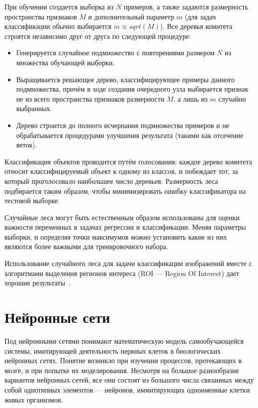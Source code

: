 \documentclass[a4paper,14pt]{extarticle} %
\begin{document}
При обучении создается выборка из $N$ примеров, а также задаются размерность пространства признаков $M$ и дополнительный параметр $m$ (для задач классификации обычно выбирается $m \approx sqrt(M)$). Все деревья комитета строятся независимо друг от друга по следующей процедуре:
\begin{itemize}
\item Генерируется случайное подмножество с повторениями размером $N$ из множества обучающей выборки.
\item Выращивается решающее дерево, классифицирующее примеры данного подмножества, причём в ходе создания очередного узла выбирается признак не из всего пространства признаков размерности $M$, а лишь из $m$ случайно выбранных. 
\item Дерево строится до полного исчерпания подмножества примеров и не обрабатывается процедурами улучшения результата (такими как отсечение веток).
\end{itemize}

Классификация объектов проводится путём голосования: каждое дерево комитета относит классифицируемый объект к одному из классов, и побеждает тот, за который проголосовало наибольшее число деревьев. Размерность леса подбирается таким образом, чтобы минимизировать ошибку классификатора на тестовой выборке. 

Случайные леса могут быть естественным образом использованы для оценки важности переменных в задачах регрессии и классификации. Меняя параметры выборки, и определяя точки максимумов можно установить какие из них являются более важными для тренировочного набора. 

Использование случайного леса для задачи классификации изображений вместе с алгоритмами выделения регионов интереса (ROI --- Region Of Interest) дает хорошие результаты~\cite{bosch2007image}.

\section{Нейронные сети}
\hspace{\parindent} Под нейронными сетями понимают математическую модель самообучающейся системы, имитирующей деятельность нервных клеток в биологических нейронных сетях. Понятие возникло при изучении процессов, протекающих в мозге, и при попытке их моделирования. Несмотря на большое разнообразие вариантов нейронных сетей, все они состоят из большого числа связанных между собой однотипных элементов --- нейронов, иммитирующих одноименные клетки живых организмов.
\end{document}
